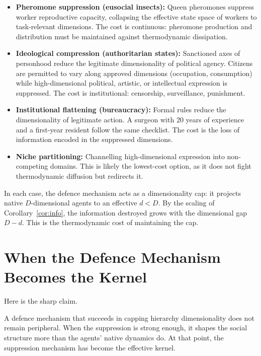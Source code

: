 \documentclass[12pt,a4paper]{article}
\begin{document}
\begin{itemize}
\item \textbf{Pheromone suppression (eusocial insects):} Queen pheromones suppress worker reproductive capacity, collapsing the effective state space of workers to task-relevant dimensions.
The cost is continuous: pheromone production and distribution must be maintained against thermodynamic dissipation.

\item \textbf{Ideological compression (authoritarian states):} Sanctioned axes of personhood reduce the legitimate dimensionality of political agency.
Citizens are permitted to vary along approved dimensions (occupation, consumption) while high-dimensional political, artistic, or intellectual expression is suppressed.
The cost is institutional: censorship, surveillance, punishment.

\item \textbf{Institutional flattening (bureaucracy):} Formal rules reduce the dimensionality of legitimate action.
A surgeon with 20 years of experience and a first-year resident follow the same checklist.
The cost is the loss of information encoded in the suppressed dimensions.

\item \textbf{Niche partitioning:} Channelling high-dimensional expression into non-competing domains.
This is likely the lowest-cost option, as it does not fight thermodynamic diffusion but redirects it.
\end{itemize}

In each case, the defence mechanism acts as a dimensionality cap: it projects native $D$-dimensional agents to an effective $d < D$.
By the scaling of Corollary~\ref{cor:info}, the information destroyed grows with the dimensional gap $D - d$.
This is the thermodynamic cost of maintaining the cap.


\section{When the Defence Mechanism Becomes the Kernel}
\label{sec:transition}

Here is the sharp claim.

A defence mechanism that succeeds in capping hierarchy dimensionality does not remain peripheral.
When the suppression is strong enough, it shapes the social structure more than the agents' native dynamics do.
At that point, the suppression mechanism has become the effective kernel.
\end{document}
